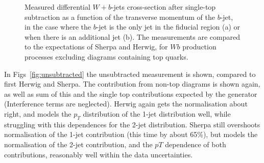 \documentclass[floatfix]{article}
\begin{document}
\begin{figure}%
\centering
{}
\caption{\label{fig:subtracted}
Measured differential $W+b$-jets cross-section after single-top subtraction as a function of the transverse momentum of the $b$-jet, in the case where the $b$-jet is the only jet in the fiducial region (a) or when there is an additional jet (b). The measurements are compared to the expectations of Sherpa and Herwig, for $Wb$ production processes excluding diagrams containing top quarks.}
\end{figure}

In Figs~\ref{fig:unsubtracted} the unsubtracted measurement is shown, compared to first Herwig and Sherpa. The contribution from non-top diagrams is shown again, as well as sum
of this and the single top contributions expected by the generator (Interference terms are neglected). Herwig again gets the normalisation about right, and models the $p_T$ 
distribution of the 1-jet distribution well, while struggling with this dependences for the 2-jet distribution. Sherpa still overshoots normalisation of the 1-jet contribution 
(this time by about 65\%), but models the normalisation of the 2-jet contribution, and the $pT$ dependence of both contributions, reasonably well within the data uncertainties.
\end{document}
